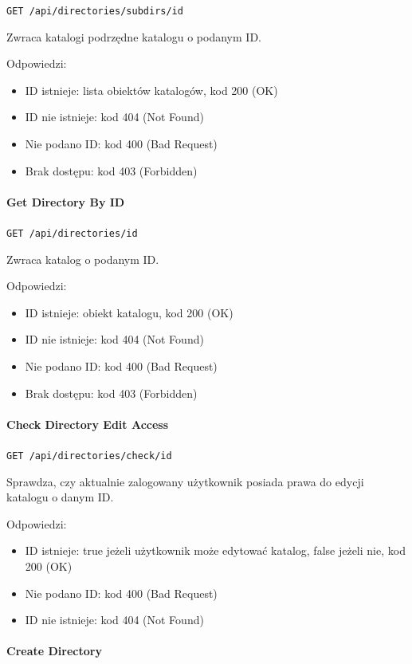 \documentclass[a4paper,twoside,12pt]{book}
\begin{document}
\texttt{GET /api/directories/subdirs/{id}}

Zwraca katalogi podrzędne katalogu o podanym ID.

Odpowiedzi: 
\begin{itemize}
	\item ID istnieje: lista obiektów katalogów, kod 200 (OK) 
	\item ID nie istnieje: kod 404 (Not Found) 
	\item Nie podano ID: kod 400 (Bad Request)
	\item Brak dostępu: kod 403 (Forbidden)
\end{itemize}

\paragraph{Get Directory By ID}

\texttt{GET /api/directories/{id}}

Zwraca katalog o podanym ID.

Odpowiedzi: 
\begin{itemize}
	\item ID istnieje: obiekt katalogu, kod 200 (OK) 
	\item ID nie istnieje: kod 404 (Not Found) 
	\item Nie podano ID: kod 400 (Bad Request)
	\item Brak dostępu: kod 403 (Forbidden)
\end{itemize}

\paragraph{Check Directory Edit Access}

\texttt{GET /api/directories/check/{id}}

Sprawdza, czy aktualnie zalogowany użytkownik posiada prawa do edycji katalogu o danym ID.

Odpowiedzi: 
\begin{itemize}
	\item ID istnieje: true jeżeli użytkownik może edytować katalog, false jeżeli nie, kod 200 (OK) 
	\item Nie podano ID: kod 400 (Bad Request) 
	\item ID nie istnieje: kod 404 (Not Found)
\end{itemize}

\paragraph{Create Directory}
\end{document}
